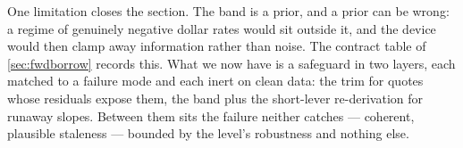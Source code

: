 One limitation closes the section.  The band is a prior, and a
prior can be wrong: a regime of genuinely negative dollar rates would
sit outside it, and the device would then clamp away information
rather than noise.  The contract table of \cref{sec:fwdborrow}
records this.  What we now have is a safeguard in two layers,
each matched to a failure mode and each inert on clean data: the trim
for quotes whose residuals expose them, the band plus the short-lever
re-derivation for runaway slopes.  Between them sits the
failure neither catches --- coherent, plausible staleness --- bounded
by the level's robustness and nothing else.
